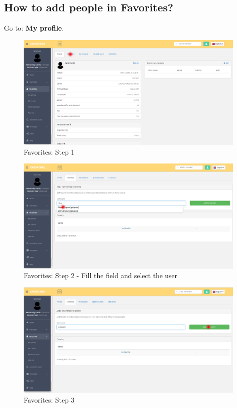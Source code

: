 \documentclass{article}
\begin{document}
\subsection{How to add people in Favorites?}
Go to: \textbf{My profile}.
\begin{figure}[!ht]
   \includegraphics[width=\textwidth]{img/fav1.png}
   \caption{Favorites: Step 1}
\end{figure}
\begin{figure}[!ht]
   \includegraphics[width=\textwidth]{img/fav2.png}
   \caption{Favorites: Step 2 - Fill the field and select the user}
\end{figure}
\begin{figure}[!ht]
   \includegraphics[width=\textwidth]{img/fav3.png}
   \caption{Favorites: Step 3}
\end{figure}
\end{document}
